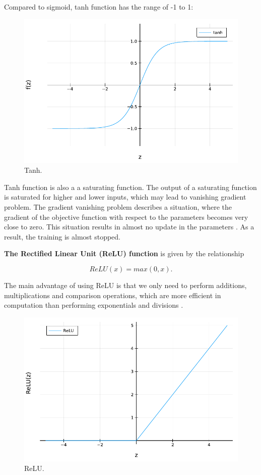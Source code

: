 \documentclass[
	parskip, 			   %
	twoside, 			   %
	DIV=14, 			   %
	BCOR=15.0mm, 		   %
	headsepline, 		   %
	open=right, 		   %
	captions=tableheading, %
	bibliography=totoc,    %
	numbers=noenddot       %
]{scrreprt}
\begin{document}
Compared to sigmoid, tanh function has the range of -1 to 1:

\begin{figure}[h!]
    \centering
    \includegraphics[scale=0.6]{figures/tanh.pdf}
    \caption{Tanh.}
    \label{fig:tanh}
\end{figure}

Tanh function is also a a saturating function. The output of a saturating function is saturated for higher and lower inputs, which may lead to vanishing gradient problem. The gradient vanishing problem describes a situation, where the gradient of the objective function with respect to the parameters becomes very close to zero. This situation results in almost no update in the parameters \cite{dubey2022activation}. As a result, the training is almost stopped.

\textbf{The Rectified Linear Unit (ReLU) function} is given by the relationship

\begin{equation}
    \label{eq:ReLU}
    ReLU(x) = max(0,x).
\end{equation}

The main advantage of using ReLU is that we only need to perform additions, multiplications and comparison operations, which are more efficient in computation than performing exponentials and divisions \cite{nwankpa2018activation}.

\begin{figure}[h!]
    \centering
    \includegraphics[scale=0.6]{figures/ReLU.pdf}
    \caption{ReLU.}
    \label{fig:ReLU}
\end{figure}
\end{document}
